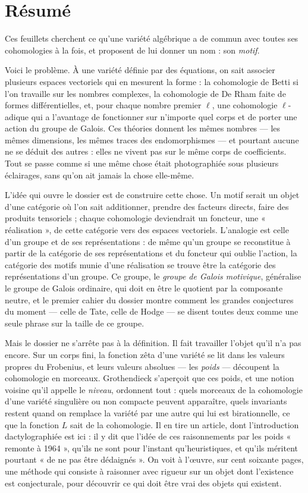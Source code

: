 \documentclass[11pt,a4paper]{article}
\begin{document}
\section*{Résumé}

\begin{resume}
Ces feuillets cherchent ce qu'une variété algébrique a de commun avec toutes
ses cohomologies à la fois, et proposent de lui donner un nom : son
\emph{motif}.

Voici le problème. À une variété définie par des équations, on sait associer
plusieurs espaces vectoriels qui en mesurent la forme : la cohomologie de Betti
si l'on travaille sur les nombres complexes, la cohomologie de De Rham faite de
formes différentielles, et, pour chaque nombre premier $\ell$, une cohomologie
$\ell$-adique qui a l'avantage de fonctionner sur n'importe quel corps et de
porter une action du groupe de Galois. Ces théories donnent les mêmes nombres
--- les mêmes dimensions, les mêmes traces des endomorphismes --- et pourtant
aucune ne se déduit des autres : elles ne vivent pas sur le même corps de
coefficients. Tout se passe comme si une même chose était photographiée sous
plusieurs éclairages, sans qu'on ait jamais la chose elle-même.

L'idée qui ouvre le dossier est de construire cette chose. Un motif serait
un objet d'une catégorie où l'on sait additionner, prendre des facteurs
directs, faire des produits tensoriels ; chaque cohomologie deviendrait un
foncteur, une « réalisation », de cette catégorie vers des espaces vectoriels.
L'analogie est celle d'un groupe et de ses représentations : de même qu'un
groupe se reconstitue à partir de la catégorie de ses représentations et du
foncteur qui oublie l'action, la catégorie des motifs munie d'une réalisation
se trouve être la catégorie des représentations d'un groupe. Ce groupe, le
\emph{groupe de Galois motivique}, généralise le groupe de Galois ordinaire,
qui doit en être le quotient
par la composante neutre, et le premier cahier du dossier montre comment
les grandes conjectures du moment --- celle de Tate, celle de Hodge --- se
disent toutes deux comme une seule phrase sur la taille de ce groupe.

Mais le dossier ne s'arrête pas à la définition. Il fait travailler l'objet
qu'il n'a pas encore. Sur un corps fini, la fonction zêta d'une variété
se lit dans les valeurs propres du Frobenius, et leurs valeurs absolues ---
les \emph{poids} --- découpent la cohomologie en morceaux. Grothendieck
s'aperçoit que ces poids, et une notion voisine qu'il appelle le
\emph{niveau}, ordonnent tout : quels morceaux de la cohomologie d'une
variété singulière ou non compacte peuvent apparaître, quels invariants
restent quand on remplace la variété par une autre qui lui est
birationnelle, ce que la fonction $L$ sait de la cohomologie. Il en tire
un article, dont l'introduction dactylographiée est ici : il y dit que
l'idée de ces raisonnements par les poids « remonte à 1964 », qu'ils ne sont
pour l'instant qu'heuristiques, et qu'ils méritent pourtant « de ne pas être
dédaignés ». On voit à l'œuvre, sur cent soixante pages, une méthode qui consiste
à raisonner avec rigueur sur un objet dont l'existence est conjecturale, pour
découvrir ce qui doit être vrai des objets qui existent.


\end{resume}
\end{document}
